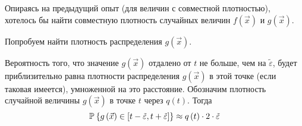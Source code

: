 Опираясь на предыдущий опыт (для величин с совместной плотностью),
хотелось бы найти совместную плотность случайных величин
$f\left( \vec{x} \right)$ и $g\left( \vec{x} \right)$.
\begin{comment}
И оказывается, что это желание является верной догадкой.

Нетрудно догадаться, что для того, чтобы найти ``вес'' поверхности уровня,
нужно будет взять поверхностный интеграл от плотности.

Чтобы мы не получали нулевой вес поверхности
$S_t = \left\{ g\left( \vec{x} \right) = t \right\}$,
будем считать объём её раздутия.
Поместим поверхность в своеобразный кокон,
толщина которого в каждой точке будет тем меньше,
чем больше скорость перехода в этой точке от текущего уровня к следующему.

Чтобы значение $t$ было близким к $g\left( \vec{u} \right)$,
нужно, чтобы точка $\vec{u}$ была близка к поверхности $S_t$.
Обозначим расстояние между $t$ и $g\left( \vec{u} \right)$
как $\tilde{\varepsilon}$,
а расстояние между точкой $\vec{u}$ и поверхностью $S_t$
как $\varepsilon$. Чему равны эти расстояния, будет выяснено ниже,
а значение $t$ и точки $\vec{u}$ будет ясно из контекста.
\end{comment}

Попробуем найти плотность распределения $g\left( \vec{x} \right)$.

Вероятность того, что значение $g\left( \vec{x} \right)$
отдалено от $t$ не больше, чем на $\tilde{\varepsilon}$,
будет приблизительно равна плотности распределения $g\left( \vec{x} \right)$
в этой точке (если таковая имеется),
умноженной на это расстояние.
Обозначим плотность случайной величины $g\left( \vec{x} \right)$
в точке $t$ через $q\left( t \right)$. Тогда
$$\mathbb{P}_{{}}\left\{ g\left( \vec{x} \right)
  \in \left[t-\tilde{\varepsilon}, t+ \tilde{\varepsilon}\right] \right\}
  \approx q\left( t \right) \cdot 2 \cdot \tilde{\varepsilon}$$

